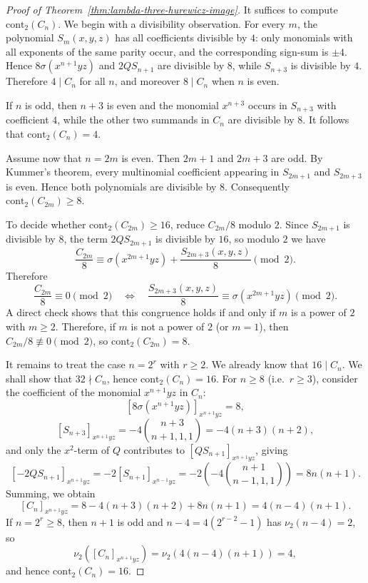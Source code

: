 \documentclass[a4paper]{amsart}
\theoremstyle{plain}
\theoremstyle{definition}
\newcommand{\cont}{\mathrm{cont}}
\renewcommand{\ge}{\geqslant}
\begin{document}
\begin{proof}[Proof of Theorem~\ref{thm:lambda-three-hurewicz-image}]
	It suffices to compute $\cont_2(C_n)$.
	We begin with a divisibility observation. For every $m$, the polynomial $S_m(x,y,z)$ has all coefficients divisible by $4$: only monomials with all exponents of the same parity occur, and the corresponding sign-sum is $\pm 4$.
	Hence $8\sigma(x^{n+1}yz)$ and $2Q S_{n+1}$ are divisible by $8$, while $S_{n+3}$ is divisible by $4$.
	Therefore $4\mid C_n$ for all $n$, and moreover $8\mid C_n$ when $n$ is even.

	If $n$ is odd, then $n+3$ is even and the monomial $x^{n+3}$ occurs in $S_{n+3}$ with coefficient $4$, while the other two summands in $C_n$ are divisible by $8$.
	It follows that $\cont_2(C_n)=4$.

	Assume now that $n=2m$ is even. Then $2m+1$ and $2m+3$ are odd. By Kummer's theorem, every multinomial coefficient appearing in $S_{2m+1}$ and $S_{2m+3}$ is even. Hence both polynomials are divisible by $8$.
	Consequently $\cont_2(C_{2m})\ge 8$.

	To decide whether $\cont_2(C_{2m})\ge 16$, reduce $C_{2m}/8$ modulo $2$. Since $S_{2m+1}$ is divisible by $8$, the term $2Q S_{2m+1}$ is divisible by $16$, so modulo $2$ we have
	\[
		\frac{C_{2m}}{8}\equiv \sigma(x^{2m+1}yz)+\frac{S_{2m+3}(x,y,z)}{8}\pmod{2}.
	\]
	Therefore
	\[
		\frac{C_{2m}}{8}\equiv 0\pmod{2}
		\quad\Longleftrightarrow\quad
		\frac{S_{2m+3}(x,y,z)}{8}\equiv \sigma(x^{2m+1}yz)\pmod{2}.
	\]
	A direct check shows that this congruence holds if and only if $m$ is a power of $2$ with $m\ge 2$. Therefore, if $m$ is not a power of $2$ (or $m=1$), then $C_{2m}/8\not\equiv 0\pmod{2}$, so $\cont_2(C_{2m})=8$.

	It remains to treat the case $n=2^r$ with $r\ge 2$. We already know that $16\mid C_n$. We shall show that $32\nmid C_n$, hence $\cont_2(C_n)=16$.
	For $n\ge 8$ (i.e.\ $r\ge 3$), consider the coefficient of the monomial $x^{n+1}yz$ in $C_n$:
	\[
		[8\sigma(x^{n+1}yz)]_{x^{n+1}yz}=8,
	\]
	\[
		[S_{n+3}]_{x^{n+1}yz}=-4\binom{n+3}{n+1,1,1}=-4(n+3)(n+2),
	\]
	and only the $x^2$-term of $Q$ contributes to $[Q S_{n+1}]_{x^{n+1}yz}$, giving
	\[
		[-2Q S_{n+1}]_{x^{n+1}yz}
		=-2 [S_{n+1}]_{x^{n-1}yz}
		=-2\left(-4\binom{n+1}{n-1,1,1}\right)
		=8n(n+1).
	\]
	Summing, we obtain
	\[
		[C_n]_{x^{n+1}yz}
		=8-4(n+3)(n+2)+8n(n+1)
		=4(n-4)(n+1).
	\]
	If $n=2^r\ge 8$, then $n+1$ is odd and $n-4=4(2^{r-2}-1)$ has $\nu_2(n-4)=2$, so
	\[
		\nu_2 \left([C_n]_{x^{n+1}yz}\right)
		=\nu_2 \left(4(n-4)(n+1)\right)=4,
	\]
	and hence $\cont_2(C_n)=16$.


\end{proof}
\end{document}
